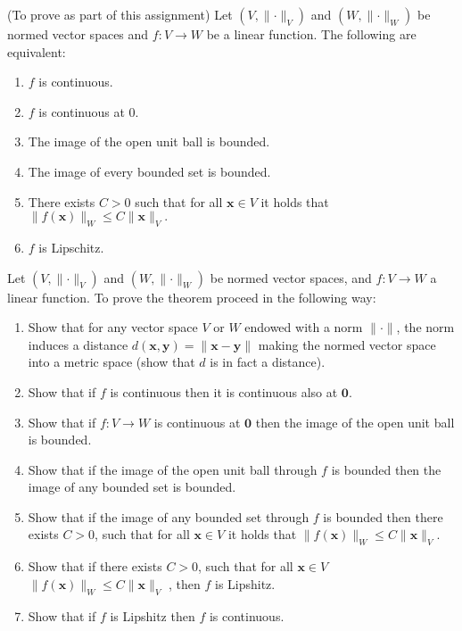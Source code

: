 \documentclass[12pt,a4paper]{article}
\begin{document}
\begin{Theorem}{(To prove as part of this assignment)}{}
	Let $(V,\lVert\cdot\rVert_V)$ and $(W,\lVert\cdot\rVert_W)$ be normed vector spaces and $f:V\to W$ be a linear function. The following are equivalent:
\begin{enumerate}[label=(\alph*)]
	\item $f$ is continuous.
	\item $f$ is continuous at $0$.
	\item The image of the open unit ball is bounded.
	\item The image of every bounded set is bounded.
	\item There exists $C>0$ such that for all $\textbf{x}\in V$ it holds that 
	$
	\lVert f(\textbf{x}) \rVert_W\leq C  \lVert \textbf{x} \rVert_V.
	$
	\item $f$ is Lipschitz.
\end{enumerate}
\end{Theorem}

\bigskip
\bigskip

\noindent Let $(V,\lVert\cdot\rVert_V)$ and $(W,\lVert\cdot\rVert_W)$ be normed vector spaces, and $f:V\to W$ a linear function. To prove the theorem proceed in the following way:
\begin{enumerate}
	\item Show that for any vector space $V$ or $W$ endowed with a norm $\lVert\cdot\rVert$, the norm induces a distance $d(\textbf{x},\textbf{y})=\lVert\textbf{x}-\textbf{y} \rVert$ making the normed vector space into a metric space (show that $d$ is in fact a distance).
	\item Show that if $f$ is continuous then it is continuous also at $\textbf{0}$.
	\item Show that if $f:V\to W$ is continuous at $\textbf{0}$ then the image of the open unit ball is bounded.
	\item Show that if the image of the open unit ball through $f$ is bounded then the image of any bounded set is bounded.
	\item Show that if the image of any bounded set through $f$ is bounded then there exists $C>0$, such that for all $\textbf{x}\in V$ it holds that 
	$
	\lVert f(\textbf{x}) \rVert_W\leq C  \lVert \textbf{x} \rVert_V.
	$
	\item Show that if there exists $C>0$, such that for all $\textbf{x}\in V$  
	$
	\lVert f(\textbf{x}) \rVert_W\leq C  \lVert \textbf{x} \rVert_V
	$
	, then $f$ is Lipshitz.
	\item Show that if $f$ is Lipshitz then $f$ is continuous.
\end{enumerate}
\bigskip
\end{document}
